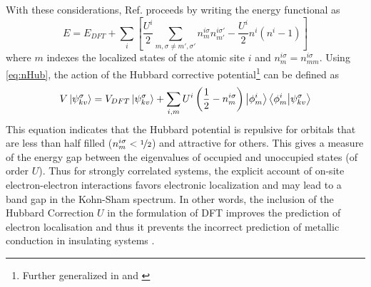 \documentclass[12pt]{article}
\newcommand{\lrp}[1]{\left( #1 \right)}
\newcommand{\lrb}[1]{\left[ #1 \right]}
\begin{document}
With these considerations, Ref. \cite{OGDFT+U} proceeds by writing the energy functional as 
\begin{equation}
    E = E_{DFT} + \sum_i \lrb{\frac{U^i}{2}\sum_{m,\sigma\neq m',\sigma'}n_{m}^{i\sigma}n^{i\sigma'}_{m'}-\frac{U^i}{2}n^i(n^i-1)}
\end{equation}
where $m$ indexes the localized states of the atomic site $i$ and $n_{m}^{i\sigma} = n_{mm}^{i\sigma}$. Using \eqref{eq:nHub}, the action of the Hubbard corrective potential\footnote{Further generalized in \cite{DFT+Uformulation} and \cite{Duradev}} can be defined as 
\begin{equation}
    V\ket{\psi^\sigma_{kv}} = V_{DFT}\ket{\psi^\sigma_{kv}} + \sum_{i,m}U^i\lrp{\frac{1}{2}-n^{i\sigma}_m}\ket{\phi^i_{m}}\bra{\phi^i_{m}}\ket{\psi^\sigma_{kv}}
\end{equation}
This equation indicates that the Hubbard potential is repulsive for orbitals that are less than half filled ($n_m^{i\sigma}<\nicefrac{1}{2}$) and attractive for others. This gives a measure of the energy gap between the eigenvalues of occupied and unoccupied states (of order $U$). Thus for strongly correlated systems, the explicit account of on-site electron-electron interactions favors electronic localization and may lead to a band gap in the Kohn-Sham spectrum.
In other words, the inclusion of the Hubbard Correction $U$ in the formulation of DFT improves the prediction of electron localisation and thus it prevents the incorrect prediction of metallic conduction in insulating systems \cite{HUBgood}.

\newpage
\printbibliography[keyword={Print Reference},title={Bibliography}]
\printbibliography[keyword={Figure},title={Figures}]
\end{document}
